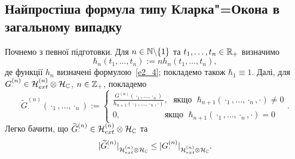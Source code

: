 \subsection{Найпростіша формула типу Кларка"=Окона в загальному випадку}
Почнемо з певної підготовки. Для $n\in\mathbb{N}\backslash\{1\}$ та
$t_1,\dots,t_n\in\mathbb{R}_+$ визначимо
\begin{equation}\label{e2_8}
\hbar_n(t_1,\dots,t_n):=nh_n(t_1,\dots,t_n),
\end{equation}
де функції $h_n$ визначені формулою~\eqref{e2_4}; покладемо також $\hbar_1\equiv 1$.
Далі, для $G^{(n)}_\cdot\in\mathcal{H}_{ext}^{(n)}\otimes\mathcal{H}_{\mathbb{C}}$,
$n\in\mathbb{Z}_+$, покладемо
\begin{equation}\label{e2_9}
\widetilde G^{(n)}_\cdot(\cdot_1,\dots,\cdot_n)
:=\begin{cases}
\frac{G^{(n)}_\cdot(\cdot_1,\dots,\cdot_n)}
{\hbar_{n+1}(\cdot_1,\dots,\cdot_n,\cdot)},{\operatorname{\ \text{якщо}\ }}
\hbar_{n+1}(\cdot_1,\dots,\cdot_n,\cdot)\not=0
\\
0,\qquad\qquad{\operatorname{\ \ \ \text{якщо}\ }}
\hbar_{n+1}(\cdot_1,\dots,\cdot_n,\cdot)=0
\end{cases}.
\end{equation}
Легко бачити, що $\widetilde G^{(n)}_\cdot
\in\mathcal{H}_{ext}^{(n)}\otimes\mathcal{H}_{\mathbb{C}}$ та
\begin{equation}\label{e2_10}
|\widetilde G^{(n)}_\cdot|_{\mathcal{H}_{ext}^{(n)}\otimes\mathcal{H}_{\mathbb{C}}}
\leq |G^{(n)}_\cdot|_{\mathcal{H}_{ext}^{(n)}\otimes\mathcal{H}_{\mathbb{C}}}.
\end{equation}

